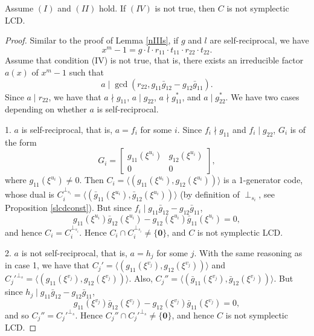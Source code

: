 \documentclass[a4paper,12pt]{article}
\begin{document}
\begin{lemma}
	Assume $(I)$ and $(II)$ hold. If $(IV)$ is not true, then $C$ is not symplectic LCD.
\end{lemma}
\begin{proof}
Similar to the proof of Lemma \ref{nIIIs}, if $g$ and $l$ are self-reciprocal, we have
\[
x^m-1  = g \cdot l \cdot r_{11} \cdot t_{11} \cdot r_{22} \cdot t_{22}.
\] 
Assume that condition (IV) is not true, that is, there exists an irreducible factor  $a(x)$ of $x^m-1$ such that 
$$a \mid \gcd(r_{22}, g_{11}\bar{g}_{12}-g_{12} \bar{g}_{11}).$$
Since $a \mid r_{22}$, we have that  $a \nmid g_{11}$,  $a \mid g_{22}$,  $a \nmid g_{11}^*$,  and $a \mid g_{22}^*$.   We have two cases depending on whether $a$ is self-reciprocal. 

1. $a$ is self-reciprocal, that is, $a=f_i$ for some $i$. Since $f_i  \nmid g_{11}$ and $f_i \mid g_{22}$, $G_i$ is of the form
\[
G_i=  \begin{bmatrix}
	g_{11}(\xi^{u_i}) & g_{12}(\xi^{u_i}) \\
	0 & 0
\end{bmatrix},
\] 
where $g_{11}(\xi^{u_i}) \ne 0$. Then   $C_i =\langle (g_{11}(\xi^{u_i}), g_{12}(\xi^{u_i}))\rangle$ is a 1-generator code, whose dual is $C_i^{\perp_{s_i}} =\langle (\bar{g}_{11}(\xi^{u_i}),\bar{g}_{12}(\xi^{u_i}))\rangle$ (by definition of $\perp_{s_i}$, see Proposition \ref{slcdconst}).   But since $f_i \mid  g_{11}\bar{g}_{12}-g_{12} \bar{g}_{11}$, 
\[
g_{11}(\xi^{u_i})\bar{g}_{12}(\xi^{u_i})-g_{12}(\xi^{u_i}) \bar{g}_{11}(\xi^{u_i}) =0, 
\]
and hence $C_i = C_i^{\perp_{s_i}}$. Hence $C_i \cap  C_i^{\perp_{s_i}} \ne \{\mathbf{0}\}$, and  $C$ is not symplectic LCD. 

2. $a$ is not self-reciprocal, that is, $a=h_j$ for some $j$. With the same reasoning as in case 1, we have that $C_j' =\langle (g_{11}(\xi^{v_j}), g_{12}(\xi^{v_j}))\rangle$ and $C_j'^{\perp_s} =\langle (g_{11}(\xi^{v_j}), g_{12}(\xi^{v_j}))\rangle$. Also, $C_j'' =\langle (\bar{g}_{11}(\xi^{v_j}), \bar{g}_{12}(\xi^{v_j}))\rangle$. 
But since $h_j \mid g_{11}\bar{g}_{12}-g_{12} \bar{g}_{11}$, 
\[
g_{11}(\xi^{v_j})\bar{g}_{12}(\xi^{v_j})-g_{12}(\xi^{v_j}) \bar{g}_{11}(\xi^{v_j}) =0, 
\]
and so $C_j'' = C_j'^{\perp_s}$. Hence $C_j'' \cap  C_j'^{\perp_s} \ne \{\mathbf{0}\}$, and hence $C$ is not symplectic LCD. 
\end{proof}
\end{document}
